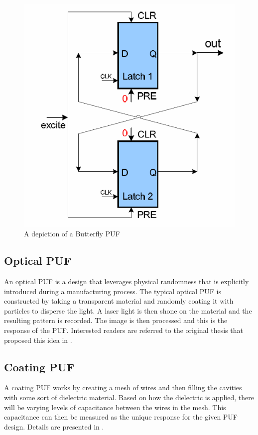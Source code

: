 \begin{figure}[h!]
\includegraphics[scale=.70]{images/butterflypuf.png}
\caption{A depiction of a Butterfly PUF}
\label{fig:butterfly}
\end{figure}
\FloatBarrier

\subsection{Optical PUF}
An optical PUF is a design that leverages physical randomness that is explicitly introduced during
a manufacturing process. The typical optical PUF is constructed by taking a transparent material
and randomly coating it with particles to disperse the light. A laser light is then shone on the material
and the resulting pattern is recorded. The image is then processed and this is the response of the
PUF. Interested readers are referred to the original thesis that proposed this idea in \cite{opticalpuf}.

\subsection{Coating PUF}
A coating PUF works by creating a mesh of wires and then filling the cavities with some sort of
dielectric material. Based on how the dielectric is applied, there will be varying levels of capacitance
between the wires in the mesh. This capacitance can then be measured as the unique response for
the given PUF design. Details are presented in \cite{coatingpuf}. 

